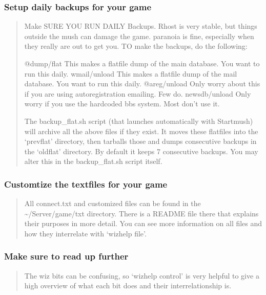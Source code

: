 \documentclass[letterpaper,10pt,english]{sphinxmanual}
\begin{document}
\subsubsection{Setup daily backups for your game}
\label{\detokenize{installation:setup-daily-backups-for-your-game}}\begin{quote}

\sphinxAtStartPar
Make SURE YOU RUN DAILY Backups.  Rhost is very stable, but things outside the mush can damage the game.
paranoia is fine, especially when they really are out to get you.  TO make the backups, do the following:

\sphinxAtStartPar
@dump/flat      \textendash{} This makes a flatfile dump of the main database.  You want to run this daily.
wmail/unload    \textendash{} This makes a flatfile dump of the mail database.  You want to run this daily.
@areg/unload    \textendash{} Only worry about this if you are using auto\sphinxhyphen{}registration emailing.  Few do.
newsdb/unload   \textendash{} Only worry if you use the hardcoded bbs system.  Most don’t use it.

\sphinxAtStartPar
The backup\_flat.sh script (that launches automatically with Startmush) will archive all the above files
if they exist.  It moves these flatfiles into the ‘prevflat’ directory, then tarballs those and dumps
consecutive backups in the ‘oldflat’ directory.  By default it keeps 7 consecutive backups.  You may
alter this in the backup\_flat.sh script itself.
\end{quote}


\subsubsection{Customtize the textfiles for your game}
\label{\detokenize{installation:customtize-the-textfiles-for-your-game}}\begin{quote}

\sphinxAtStartPar
All connect.txt and customized files can be found in the \textasciitilde{}/Server/game/txt directory.  There is a
README file there that explains their purposes in more detail.  You can see more information on
all files and how they inter\sphinxhyphen{}relate with ‘wizhelp file’.
\end{quote}


\subsubsection{Make sure to read up further}
\label{\detokenize{installation:make-sure-to-read-up-further}}\begin{quote}

\sphinxAtStartPar
The wiz bits can be confusing, so ‘wizhelp control’ is very helpful to give a high overview
of what each bit does and their inter\sphinxhyphen{}relationship is.
\end{quote}
\end{document}
